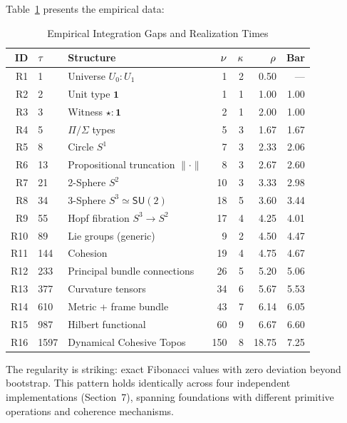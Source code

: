 \documentclass[11pt]{article}
\theoremstyle{definition}
\theoremstyle{remark}
\begin{document}
Table~\ref{tab:fibonacci-data} presents the empirical data:

\begin{table}[htbp]
\centering
\caption{Empirical Integration Gaps and Realization Times}
\label{tab:fibonacci-data}
\small
\begin{tabular}{@{}rllrrrr@{}}
\toprule
\textbf{ID} & $\boldmath{\tau}$ & \textbf{Structure} & $\boldmath{\nu}$ & $\boldmath{\kappa}$ & $\boldmath{\rho}$ & \textbf{Bar} \\
\midrule
R1  & 1    & Universe $U_0 : U_1$                & 1   & 2 & 0.50 & ---  \\
R2  & 2    & Unit type $\mathbf{1}$              & 1   & 1 & 1.00 & 1.00 \\
R3  & 3    & Witness $\star : \mathbf{1}$        & 2   & 1 & 2.00 & 1.00 \\
R4  & 5    & $\Pi/\Sigma$ types                   & 5   & 3 & 1.67 & 1.67 \\
R5  & 8    & Circle $S^1$                         & 7   & 3 & 2.33 & 2.06 \\
R6  & 13   & Propositional truncation $\|\cdot\|$ & 8   & 3 & 2.67 & 2.60 \\
R7  & 21   & 2-Sphere $S^2$                       & 10  & 3 & 3.33 & 2.98 \\
R8  & 34   & 3-Sphere $S^3 \simeq \mathsf{SU}(2)$ & 18  & 5 & 3.60 & 3.44 \\
R9  & 55   & Hopf fibration $S^3 \to S^2$        & 17  & 4 & 4.25 & 4.01 \\
R10 & 89   & Lie groups (generic)                 & 9   & 2 & 4.50 & 4.47 \\
R11 & 144  & Cohesion                             & 19  & 4 & 4.75 & 4.67 \\
R12 & 233  & Principal bundle connections         & 26  & 5 & 5.20 & 5.06 \\
R13 & 377  & Curvature tensors                    & 34  & 6 & 5.67 & 5.53 \\
R14 & 610  & Metric + frame bundle                & 43  & 7 & 6.14 & 6.05 \\
R15 & 987  & Hilbert functional                   & 60  & 9 & 6.67 & 6.60 \\
R16 & 1597 & Dynamical Cohesive Topos             & 150 & 8 & 18.75 & 7.25 \\
\bottomrule
\end{tabular}
\end{table}


The regularity is striking: exact Fibonacci values with zero deviation beyond bootstrap. This pattern
holds identically across four independent implementations (Section~7), spanning foundations with
different primitive operations and coherence mechanisms.
\end{document}
